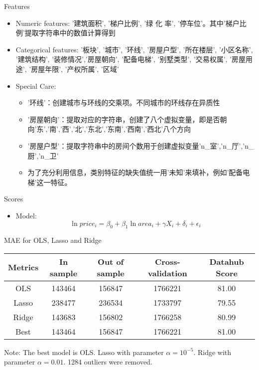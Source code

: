 \documentclass{beamer}
\begin{document}
\begin{frame}{Features}
    \begin{itemize}
        \item Numeric features: '建筑面积', '梯户比例', '绿 化 率', '停车位'。其中'梯户比例'提取字符串中的数值计算得到
        \item Categorical features: '板块', '城市', '环线', '房屋户型', '所在楼层', '小区名称', '建筑结构', '装修情况','房屋朝向', '配备电梯', '别墅类型', '交易权属', '房屋用途', '房屋年限', '产权所属', '区域'
        \item Special Care: \begin{itemize}
            \item '环线'：创建城市与环线的交乘项。不同城市的环线存在异质性
            \item '房屋朝向'：提取对应的字符串，创建了八个虚拟变量，即是否朝向'东','南','西','北','东北','东南','西南','西北'八个方向
            \item '房屋户型'：提取字符串中的房间个数用于创建虚拟变量'n\_室','n\_厅','n\_厨','n\_卫'
            \item 为了充分利用信息，类别特征的缺失值统一用'未知'来填补，例如'配备电梯'这一特征。
        \end{itemize}
    \end{itemize}
\end{frame}

\begin{frame}{Scores}
    \small
    \begin{itemize}
        \item Model:$$
        \ln price_i = \beta_0 + \beta_1 \ln area_i + \gamma  X_i + \delta _i + \epsilon_i
        $$
    \end{itemize}
    \begin{threeparttable}
        \center
        \caption{MAE for OLS, Lasso and Ridge}
        \begin{tabular}{c|cccc}
            \toprule
            Metrics & In sample & Out of sample & Cross-validation & Datahub Score \\
            \midrule
            OLS & 143464 & 156847 & 1766221 & 81.00 \\
            Lasso & 238477 & 236534 & 1733797 & 79.55\\
            Ridge & 143683 & 156802 & 1766258 & 80.99\\
            Best & 143464 & 156847 & 1766221 & 81.00\\
            \bottomrule
        \end{tabular}
        \begin{tablenotes}
            \item Note: The best model is OLS. Lasso with parameter $\alpha = 10^{-5}$. Ridge with parameter $\alpha = 0.01$. 1284 outliers were removed.
         \end{tablenotes}
    \end{threeparttable}
\end{frame}
\end{document}

